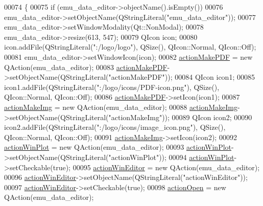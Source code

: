 \begin{DoxyCode}
00074     \{
00075         \textcolor{keywordflow}{if} (emu\_data\_editor->objectName().isEmpty())
00076             emu\_data\_editor->setObjectName(QStringLiteral(\textcolor{stringliteral}{"emu\_data\_editor"}));
00077         emu\_data\_editor->setWindowModality(Qt::NonModal);
00078         emu\_data\_editor->resize(613, 547);
00079         QIcon icon;
00080         icon.addFile(QStringLiteral(\textcolor{stringliteral}{":/logo/logo"}), QSize(), QIcon::Normal, QIcon::Off);
00081         emu\_data\_editor->setWindowIcon(icon);
00082         \hyperlink{a00026_af013c084ff0ed9ae39a60aa7a39bdd91}{actionMakePDF} = \textcolor{keyword}{new} QAction(emu\_data\_editor);
00083         \hyperlink{a00026_af013c084ff0ed9ae39a60aa7a39bdd91}{actionMakePDF}->setObjectName(QStringLiteral(\textcolor{stringliteral}{"actionMakePDF"}));
00084         QIcon icon1;
00085         icon1.addFile(QStringLiteral(\textcolor{stringliteral}{":/logo/icons/PDF-icon.png"}), QSize(), QIcon::Normal, QIcon::Off);
00086         \hyperlink{a00026_af013c084ff0ed9ae39a60aa7a39bdd91}{actionMakePDF}->setIcon(icon1);
00087         \hyperlink{a00026_a345313e538e5ef49cd27c1fc0bdd4173}{actionMakeImg} = \textcolor{keyword}{new} QAction(emu\_data\_editor);
00088         \hyperlink{a00026_a345313e538e5ef49cd27c1fc0bdd4173}{actionMakeImg}->setObjectName(QStringLiteral(\textcolor{stringliteral}{"actionMakeImg"}));
00089         QIcon icon2;
00090         icon2.addFile(QStringLiteral(\textcolor{stringliteral}{":/logo/icons/image\_icon.png"}), QSize(), QIcon::Normal, QIcon::Off);
00091         \hyperlink{a00026_a345313e538e5ef49cd27c1fc0bdd4173}{actionMakeImg}->setIcon(icon2);
00092         \hyperlink{a00026_a0aeb289d8df9db6f4329e9000e44d511}{actionWinPlot} = \textcolor{keyword}{new} QAction(emu\_data\_editor);
00093         \hyperlink{a00026_a0aeb289d8df9db6f4329e9000e44d511}{actionWinPlot}->setObjectName(QStringLiteral(\textcolor{stringliteral}{"actionWinPlot"}));
00094         \hyperlink{a00026_a0aeb289d8df9db6f4329e9000e44d511}{actionWinPlot}->setCheckable(\textcolor{keyword}{true});
00095         \hyperlink{a00026_aa5d56420958ab4fd1239e29714d75e18}{actionWinEditor} = \textcolor{keyword}{new} QAction(emu\_data\_editor);
00096         \hyperlink{a00026_aa5d56420958ab4fd1239e29714d75e18}{actionWinEditor}->setObjectName(QStringLiteral(\textcolor{stringliteral}{"actionWinEditor"}));
00097         \hyperlink{a00026_aa5d56420958ab4fd1239e29714d75e18}{actionWinEditor}->setCheckable(\textcolor{keyword}{true});
00098         \hyperlink{a00026_a3ceb57268680eb23f6a3d522b303bb43}{actionOpen} = \textcolor{keyword}{new} QAction(emu\_data\_editor);

\end{DoxyCode}

